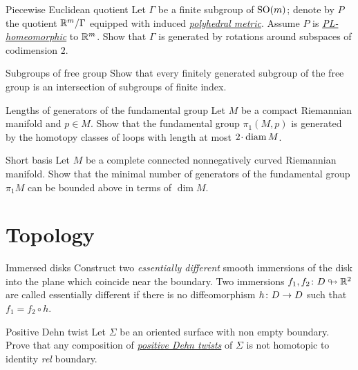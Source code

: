 \documentclass[twoside]{book}
\begin{document}
{{}

\begin{pr}{\easy}{Piecewise Euclidean quotient}\label{Piecewise Euclidean quotient}
Let $\Gamma$ be a finite subgroup of $\mathrm{SO}(m)$; 
denote by $P$ the quotient $\mathbb{R}^m/\Gamma$ equipped with induced
\hyperref[Polyhedral space]{\emph{polyhedral metric}}.
Assume $P$ is \hyperref[PL-homeomorphism]{\emph{PL-homeomorphic}} to $\mathbb{R}^m$.
Show that $\Gamma$ is generated by rotations  around subspaces of codimension $2$.
\end{pr}

\begin{pr}{\easy}{Subgroups of free group}\label{Subgroups of free group}
Show that every finitely generated subgroup of the free group 
is an intersection of subgroups of finite index.
\end{pr}

\begin{pr}{\easy}{Lengths of generators of the fundamental group}\label{Lengths of generators of the fundamental group}
Let $M$ be a compact Riemannian manifold and $p\in M$.
Show that the fundamental group $\pi_1(M,p)$
is generated by the homotopy classes of loops with length at most $2\cdot\diam M$.
\end{pr}

\begin{pr}{}{Short basis}\label{Short basis}
Let $M$ be a complete connected nonnegatively curved Riemannian manifold.
Show that the minimal number of generators of the fundamental group $\pi_1 M$
can be bounded above in terms of $\dim M$.
\end{pr}



\chapter{Topology}

\begin{pr}{}{Immersed disks}\label{Immersed disks} 
Construct two \emph{essentially different} smooth immersions of the disk 
into the plane which coincide near the boundary. 
Two immersions $f_1,f_2\colon D\looparrowright \mathbb{R}^2$ are called essentially different 
if there is no diffeomorphism $h\:D\z\to D$ such that
$f_1=f_2\circ h$.
\end{pr}

\begin{pr}{\easy}{Positive Dehn twist}\label{Positive Dehn twist} Let $\Sigma$ be an oriented surface with non empty boundary.
Prove that any composition of \hyperref[Dehn twist]{\emph{positive Dehn twists}} of $\Sigma$ is not homotopic to identity \emph{rel} boundary.
\end{pr}

}
\end{document}
